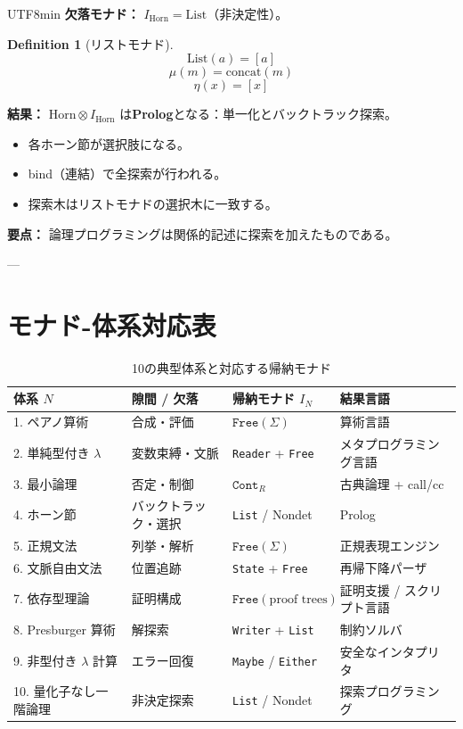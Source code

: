 \documentclass[a4paper,11pt]{article}
\renewcommand{\emph}[1]{\textbf{#1}}
\theoremstyle{definition}
\newtheorem{definition}{Definition}[section]
\begin{document}
\begin{CJK}{UTF8}{min}
\textbf{欠落モナド：} $I_{\text{Horn}} = \text{List}$（非決定性）。

\begin{definition}[リストモナド]
\[\text{List}(a) = [a]\]
\[\mu(m) = \text{concat}(m)\]
\[\eta(x) = [x]\]
\end{definition}

\textbf{結果：} $\text{Horn} \otimes I_{\text{Horn}}$ は\emph{Prolog}となる：単一化とバックトラック探索。
\begin{itemize}
  \item 各ホーン節が選択肢になる。
  \item bind（連結）で全探索が行われる。
  \item 探索木はリストモナドの選択木に一致する。
\end{itemize}

\textbf{要点：} 論理プログラミングは関係的記述に探索を加えたものである。

---

\section{モナド-体系対応表}

\begin{table}[h!]
\centering
\small
\begin{tabularx}{\linewidth}{l >{\raggedright\arraybackslash}X l >{\raggedright\arraybackslash}X}
\toprule
\textbf{体系 } $N$ & \textbf{隙間 / 欠落} & \textbf{帰納モナド } $I_N$ & \textbf{結果言語} \\
\midrule
1. ペアノ算術 & 合成・評価 & $\texttt{Free}(\Sigma)$ & 算術言語 \\
2. 単純型付き $\lambda$ & 変数束縛・文脈 & \texttt{Reader} + \texttt{Free} & メタプログラミング言語 \\
3. 最小論理 & 否定・制御 & $\texttt{Cont}_R$ & 古典論理 + call/cc \\
4. ホーン節 & バックトラック・選択 & \texttt{List} / Nondet & Prolog \\
5. 正規文法 & 列挙・解析 & $\texttt{Free}(\Sigma)$ & 正規表現エンジン \\
6. 文脈自由文法 & 位置追跡 & \texttt{State} + \texttt{Free} & 再帰下降パーザ \\
7. 依存型理論 & 証明構成 & $\texttt{Free}(\text{proof trees})$ & 証明支援 / スクリプト言語 \\
8. Presburger 算術 & 解探索 & \texttt{Writer} + \texttt{List} & 制約ソルバ \\
9. 非型付き $\lambda$ 計算 & エラー回復 & \texttt{Maybe} / \texttt{Either} & 安全なインタプリタ \\
10. 量化子なし一階論理 & 非決定探索 & \texttt{List} / Nondet & 探索プログラミング \\
\bottomrule
\end{tabularx}
\caption{10の典型体系と対応する帰納モナド}
\label{tab:correspondence}
\end{table}


\end{CJK}
\end{document}
